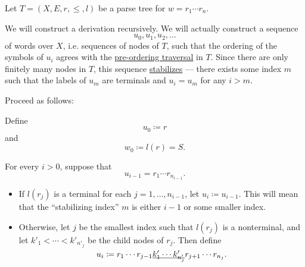 \begin{algorithm}\label{alg:parse_tree_to_leftmost_derivation}
  Let \( T = (X, E, r, \leq, l) \) be a parse tree for \( w = r_1 \cdots r_n \).

  We will construct a derivation recursively. We will actually construct a sequence
  \begin{equation*}
    u_0, u_1, u_2, \ldots
  \end{equation*}
  of words over \( X \), i.e. sequences of nodes of \( T \), such that the ordering of the symbols of \( u_i \) agrees with the \hyperref[def:traversal_ordering]{pre-ordering traversal} in \( T \). Since there are only finitely many nodes in \( T \), this sequence \hyperref[def:stabilizing_sequence]{stabilizes} --- there exists some index \( m \) such that the labels of \( u_m \) are terminals and \( u_i = u_m \) for any \( i > m \).

  Proceed as follows:
  \begin{thmenum}
     Define
    \begin{equation*}
      u_0 \coloneqq r
    \end{equation*}
    and
    \begin{equation*}
      w_0 \coloneqq l(r) = S.
    \end{equation*}

     For every \( i > 0 \), suppose that
    \begin{equation*}
      u_{i-1} = r_1 \cdots r_{n_{i-1}}.
    \end{equation*}

    \begin{itemize}
      \item If \( l(r_j) \) is a terminal for each \( j = 1, \ldots, n_{i-1} \), let \( u_i \coloneqq u_{i-1} \). This will mean that the \enquote{stabilizing index} \( m \) is either \( i - 1 \) or some smaller index.

      \item Otherwise, let \( j \) be the smallest index such that \( l(r_j) \) is a nonterminal, and let \( k'_1 < \cdots < k'_{n'_j} \) be the child nodes of \( r_j \). Then define
      \begin{equation*}
        u_i \coloneqq r_1 \cdots r_{j-1} \underline{\smash{ k'_1 \cdots k'_{n'_j} }} r_{j+1} \cdots r_{n_j}.
      \end{equation*}


\end{itemize}
\end{thmenum}
\end{algorithm}
